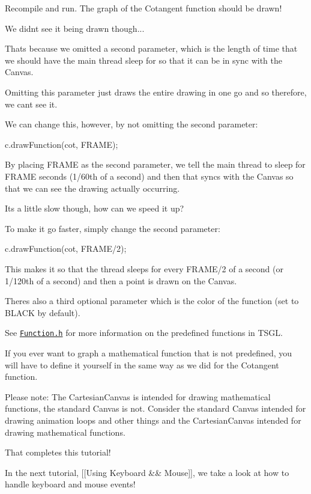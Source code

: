 Recompile and run. The graph of the Cotangent function should be drawn!

We didn\textquotesingle{}t see it being drawn though...

That\textquotesingle{}s because we omitted a second parameter, which is the length of time that we should have the main thread sleep for so that it can be in sync with the Canvas.

Omitting this parameter just draws the entire drawing in one go and so therefore, we can\textquotesingle{}t see it.

We can change this, however, by not omitting the second parameter\+:


\begin{DoxyCode}
c.drawFunction(cot, FRAME);
\end{DoxyCode}


By placing F\+R\+A\+M\+E as the second parameter, we tell the main thread to sleep for F\+R\+A\+M\+E seconds (1/60th of a second) and then that syncs with the Canvas so that we can see the drawing actually occurring.

It\textquotesingle{}s a little slow though, how can we speed it up?

To make it go faster, simply change the second parameter\+:


\begin{DoxyCode}
c.drawFunction(cot, FRAME/2);
\end{DoxyCode}


This makes it so that the thread sleeps for every F\+R\+A\+M\+E/2 of a second (or 1/120th of a second) and then a point is drawn on the Canvas.

There\textquotesingle{}s also a third optional parameter which is the color of the function (set to B\+L\+A\+C\+K by default).

See \href{http://calvin-cs.github.io/TSGL/html/classtsgl_1_1_function.html}{\tt Function.\+h} for more information on the predefined functions in T\+S\+G\+L.

If you ever want to graph a mathematical function that is not predefined, you will have to define it yourself in the same way as we did for the Cotangent function.

Please note\+: The Cartesian\+Canvas is intended for drawing mathematical functions, the standard Canvas is not. Consider the standard Canvas intended for drawing animation loops and other things and the Cartesian\+Canvas intended for drawing mathematical functions.

That completes this tutorial!

In the next tutorial, \mbox{[}\mbox{[}Using Keyboard \&\& Mouse\mbox{]}\mbox{]}, we take a look at how to handle keyboard and mouse events! 
